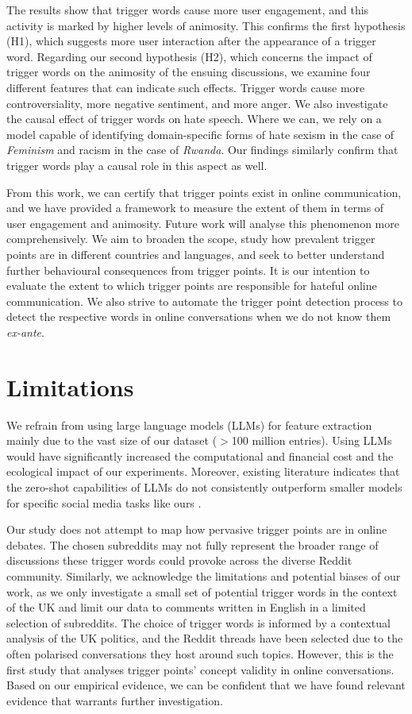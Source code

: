 The results show that trigger words cause more user engagement, and this activity is marked by higher levels of animosity. This confirms the first hypothesis (H1), which suggests more user interaction after the appearance of a trigger word. Regarding our second hypothesis (H2), which concerns the impact of trigger words on the animosity of the ensuing discussions, we examine four different features that can indicate such effects. Trigger words cause more controversiality, more negative sentiment, and more anger. We also investigate the causal effect of trigger words on hate speech. Where we can, we rely on a model capable of identifying domain-specific forms of hate \textemdash sexism in the case of \textit{Feminism} and racism in the case of \textit{Rwanda}\textemdash. Our findings similarly confirm that trigger words play a causal role in this aspect as well.

From this work, we can certify that trigger points exist in online communication, and we have provided a framework to measure the extent of them in terms of user engagement and animosity. Future work will analyse this phenomenon more comprehensively. We aim to broaden the scope, study how prevalent trigger points are in different countries and languages, and seek to better understand further behavioural consequences from trigger points. It is our intention to evaluate the extent to which trigger points are responsible for hateful online communication. We also strive to automate the trigger point detection process to detect the respective words in online conversations when we do not know them \emph{ex-ante}.

\section{Limitations}
We refrain from using large language models (LLMs) for feature extraction mainly due to the vast size of our dataset ($>$100 million entries). Using LLMs would have significantly increased the computational and financial cost and the ecological impact of our experiments. Moreover, existing literature indicates that the zero-shot capabilities of LLMs do not consistently outperform smaller models for specific social media tasks like ours \cite{antypas-etal-2023-supertweeteval}.

Our study does not attempt to map how pervasive trigger points are in online debates. The chosen subreddits may not fully represent the broader range of discussions these trigger words could provoke across the diverse Reddit community. Similarly, we acknowledge the limitations and potential biases of our work, as we only investigate a small set of potential trigger words in the context of the UK and limit our data to comments written in English in a limited selection of subreddits. The choice of trigger words is informed by a contextual analysis of the UK politics, and the Reddit threads have been selected due to the often polarised conversations they host around such topics. However, this is the first study that analyses trigger points' concept validity in online conversations. Based on our empirical evidence, we can be confident that we have found relevant evidence that warrants further investigation. 

